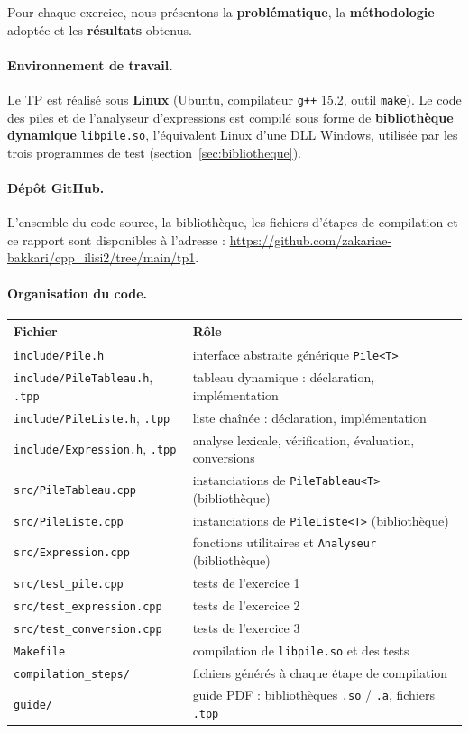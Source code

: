 \documentclass[11pt,a4paper]{article}
\newcommand{\code}[1]{\texttt{#1}}
\begin{document}
Pour chaque exercice, nous présentons la \textbf{problématique}, la
\textbf{méthodologie} adoptée et les \textbf{résultats} obtenus.

\paragraph{Environnement de travail.} Le TP est réalisé sous \textbf{Linux}
(Ubuntu, compilateur \code{g++} 15.2, outil \code{make}). Le code des piles
et de l'analyseur d'expressions est compilé sous forme de
\textbf{bibliothèque dynamique} \code{libpile.so}, l'équivalent Linux d'une
DLL Windows, utilisée par les trois programmes de test
(section~\ref{sec:bibliotheque}).

\paragraph{Dépôt GitHub.} L'ensemble du code source, la bibliothèque, les
fichiers d'étapes de compilation et ce rapport sont disponibles à
l'adresse : \url{https://github.com/zakariae-bakkari/cpp_ilisi2/tree/main/tp1}.

\paragraph{Organisation du code.}
\begin{center}
\small
\begin{tabularx}{\linewidth}{l X}
  \toprule
  \textbf{Fichier} & \textbf{Rôle} \\
  \midrule
  \code{include/Pile.h}        & interface abstraite générique \code{Pile<T>} \\
  \code{include/PileTableau.h}, \code{.tpp} & tableau dynamique : déclaration, implémentation \\
  \code{include/PileListe.h}, \code{.tpp}   & liste chaînée : déclaration, implémentation \\
  \code{include/Expression.h}, \code{.tpp}  & analyse lexicale, vérification, évaluation, conversions \\
  \code{src/PileTableau.cpp}   & instanciations de \code{PileTableau<T>} (bibliothèque) \\
  \code{src/PileListe.cpp}     & instanciations de \code{PileListe<T>} (bibliothèque) \\
  \code{src/Expression.cpp}    & fonctions utilitaires et \code{Analyseur} (bibliothèque) \\
  \code{src/test\_pile.cpp}       & tests de l'exercice 1 \\
  \code{src/test\_expression.cpp} & tests de l'exercice 2 \\
  \code{src/test\_conversion.cpp} & tests de l'exercice 3 \\
  \code{Makefile}              & compilation de \code{libpile.so} et des tests \\
  \code{compilation\_steps/}   & fichiers générés à chaque étape de compilation \\
  \code{guide/}                & guide PDF : bibliothèques \code{.so} / \code{.a}, fichiers \code{.tpp} \\
  \bottomrule
\end{tabularx}
\end{center}
\end{document}
